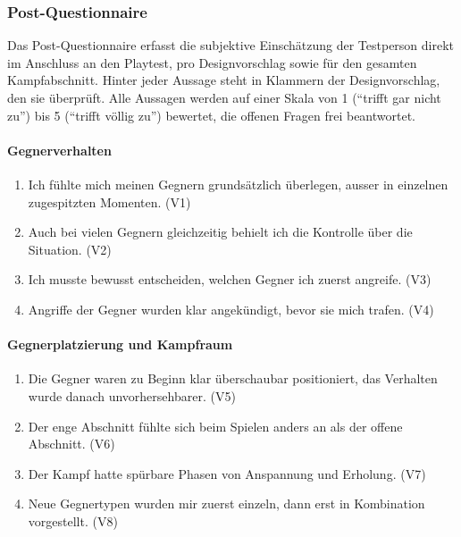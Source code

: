 \documentclass[../Main.tex]{subfiles}
\begin{document}
\subsubsection{Post-Questionnaire}

Das Post-Questionnaire erfasst die subjektive Einschätzung der Testperson direkt im Anschluss an den Playtest, pro Designvorschlag sowie für den gesamten Kampfabschnitt. Hinter jeder Aussage steht in Klammern der Designvorschlag, den sie überprüft. Alle Aussagen werden auf einer Skala von 1 (\enquote{trifft gar nicht zu}) bis 5 (\enquote{trifft völlig zu}) bewertet, die offenen Fragen frei beantwortet.

\paragraph{Gegnerverhalten}
\begin{enumerate}[label=\textbf{Q\arabic*}, leftmargin=1.5cm, itemsep=0.5em]
    \item Ich fühlte mich meinen Gegnern grundsätzlich überlegen, ausser in einzelnen zugespitzten Momenten. \hfill (V1)
    \item Auch bei vielen Gegnern gleichzeitig behielt ich die Kontrolle über die Situation. \hfill (V2)
    \item Ich musste bewusst entscheiden, welchen Gegner ich zuerst angreife. \hfill (V3)
    \item Angriffe der Gegner wurden klar angekündigt, bevor sie mich trafen. \hfill (V4)
\end{enumerate}

\paragraph{Gegnerplatzierung und Kampfraum}
\begin{enumerate}[label=\textbf{Q\arabic*}, leftmargin=1.5cm, itemsep=0.5em, resume]
    \item Die Gegner waren zu Beginn klar überschaubar positioniert, das Verhalten wurde danach unvorhersehbarer. \hfill (V5)
    \item Der enge Abschnitt fühlte sich beim Spielen anders an als der offene Abschnitt. \hfill (V6)
    \item Der Kampf hatte spürbare Phasen von Anspannung und Erholung. \hfill (V7)
    \item Neue Gegnertypen wurden mir zuerst einzeln, dann erst in Kombination vorgestellt. \hfill (V8)
\end{enumerate}
\end{document}
